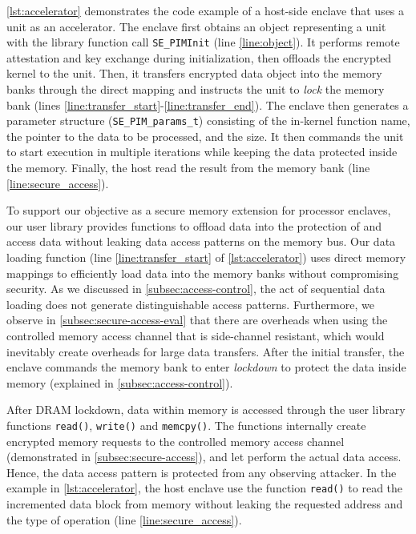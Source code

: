 \autoref{lst:accelerator} demonstrates the code example of a host-side enclave that uses a \thename unit as an accelerator. The enclave first obtains an object representing a \thename unit with the library function call \texttt{SE\_PIMInit} (line \ref{line:object}). It performs remote attestation and key exchange during initialization, then offloads the encrypted \thename kernel to the \thename unit. Then, it transfers encrypted data object into the memory banks through the direct mapping and instructs the \thename unit to \emph{lock} the memory bank (lines \ref{line:transfer_start}-\ref{line:transfer_end}). The enclave then generates a parameter structure (\texttt{SE\_PIM\_params\_t}) consisting of the in-kernel function name, the pointer to the data to be processed, and the size. It then commands the \thename unit to start execution in multiple iterations while keeping the data protected inside the memory. Finally, the host read the result from the memory bank (line \ref{line:secure_access}).


To support our objective as a secure memory extension for processor enclaves, our user library provides functions to offload data into the protection of \thename and access data without leaking data access patterns on the memory bus. Our data loading function (line \ref{line:transfer_start} of \autoref{lst:accelerator}) uses direct memory mappings to efficiently load data into the \thename memory banks without compromising security. As we discussed in \cref{subsec:access-control}, the act of sequential data loading does not generate distinguishable access patterns. Furthermore, we observe in \cref{subsec:secure-access-eval} that there are overheads when using the controlled memory access channel that is side-channel resistant, which would inevitably create overheads for large data transfers. After the initial transfer, the enclave commands the memory bank to enter \emph{lockdown} to protect the data inside memory (explained in \cref{subsec:access-control}).

After DRAM lockdown, data within memory is accessed through the user library functions \texttt{read()}, \texttt{write()} and \texttt{memcpy()}. The functions internally create encrypted memory requests to the controlled memory access channel (demonstrated in \cref{subsec:secure-access}), and let \thename perform the actual data access. Hence, the data access pattern is protected from any observing attacker. In the example in \autoref{lst:accelerator}, the host enclave use the function \texttt{read()} to read the incremented data block from memory without leaking the requested address and the type of operation (line \ref{line:secure_access}).

